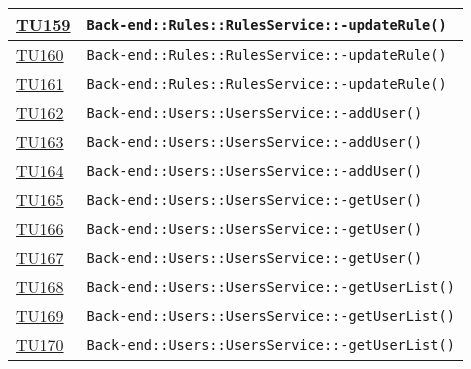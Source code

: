 \begin{longtable}{|>{\centering}m{1cm}|m{12cm}<{\centering}|}
\hyperlink{TU159}{TU159} & \texttt{Back-end::Rules::RulesService::-\linebreak updateRule()}\\ \hline

\hyperlink{TU160}{TU160} & \texttt{Back-end::Rules::RulesService::-\linebreak updateRule()}\\ \hline

\hyperlink{TU161}{TU161} & \texttt{Back-end::Rules::RulesService::-\linebreak updateRule()}\\ \hline

\hyperlink{TU162}{TU162} & \texttt{Back-end::Users::UsersService::-\linebreak addUser()}\\ \hline

\hyperlink{TU163}{TU163} & \texttt{Back-end::Users::UsersService::-\linebreak addUser()}\\ \hline

\hyperlink{TU164}{TU164} & \texttt{Back-end::Users::UsersService::-\linebreak addUser()}\\ \hline

\hyperlink{TU165}{TU165} & \texttt{Back-end::Users::UsersService::-\linebreak getUser()}\\ \hline

\hyperlink{TU166}{TU166} & \texttt{Back-end::Users::UsersService::-\linebreak getUser()}\\ \hline

\hyperlink{TU167}{TU167} & \texttt{Back-end::Users::UsersService::-\linebreak getUser()}\\ \hline

\hyperlink{TU168}{TU168} & \texttt{Back-end::Users::UsersService::-\linebreak getUserList()}\\ \hline

\hyperlink{TU169}{TU169} & \texttt{Back-end::Users::UsersService::-\linebreak getUserList()}\\ \hline

\hyperlink{TU170}{TU170} & \texttt{Back-end::Users::UsersService::-\linebreak getUserList()}\\ \hline


\end{longtable}
